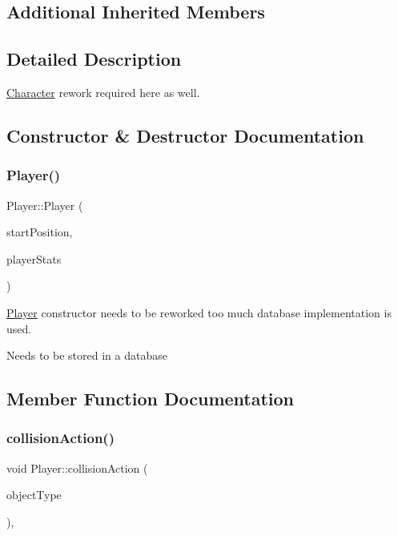 \subsection*{Additional Inherited Members}


\subsection{Detailed Description}
\hyperlink{class_character}{Character} rework required here as well. 

\subsection{Constructor \& Destructor Documentation}
\mbox{\label{class_player_afb985ed4c767e1ad824655b9f5f9d597}} 
\subsubsection{\texorpdfstring{Player()}{Player()}}
{\footnotesize\ttfamily Player\+::\+Player (\begin{DoxyParamCaption}\item[{\hyperlink{class_vector2_d}{Vector2D}$<$ double $>$ \&}]{start\+Position,  }\item[{\hyperlink{class_character}{Character}}]{player\+Stats }\end{DoxyParamCaption})}



\hyperlink{class_player}{Player} constructor needs to be reworked too much database implementation is used. 

Needs to be stored in a database 

\subsection{Member Function Documentation}
\mbox{\label{class_player_a965e7e8baf9b270e1b22784b890bc74d}} 
\subsubsection{\texorpdfstring{collision\+Action()}{collisionAction()}}
{\footnotesize\ttfamily void Player\+::collision\+Action (\begin{DoxyParamCaption}\item[{Game\+Object\+Type}]{object\+Type }\end{DoxyParamCaption})\hspace{0.3cm}{\ttfamily [override]}, {\ttfamily [virtual]}}

